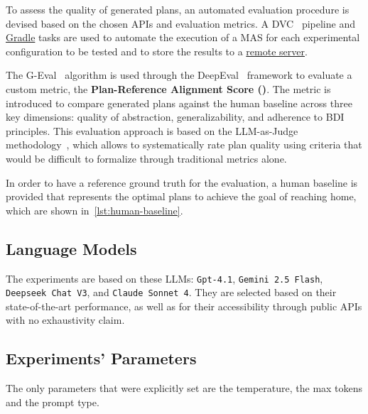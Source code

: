 \documentclass[12pt,a4paper,openright,twoside]{book}
\begin{document}
To assess the quality of generated plans, an automated evaluation procedure is devised based on the chosen APIs and evaluation metrics.
%
A DVC~\cite{ruslan_kuprieiev_2025_15646974} pipeline and \href{https://gradle.org/}{Gradle} tasks are used to automate the execution of a MAS for each experimental configuration to be tested and to store the results to a \href{https://dagshub.com/rbattistini/plan-generation-experiments}{remote server}.

The G-Eval~\cite{liuGEvalNLGEvaluation2023} algorithm is used through the DeepEval~\cite{Ip_deepeval_2025} framework to evaluate a custom metric, the \textbf{Plan-Reference Alignment Score (\PRAS{})}.
%
The metric is introduced to compare generated plans against the human baseline across three key dimensions: quality of abstraction, generalizability, and adherence to BDI principles.
%
This evaluation approach is based on the LLM-as-Judge methodology~\cite{DBLP:journals/corr/abs-2412-05579}, which allows to systematically rate plan quality using criteria that would be difficult to formalize through traditional metrics alone.

In order to have a reference ground truth for the evaluation, a human baseline is provided that represents the optimal plans to achieve the goal of reaching home, which are shown in~\cref{lst:human-baseline}.



\subsection{Language Models}\label{sec:chosen-llms}

The experiments are based on these \ac{LLM}s: \texttt{Gpt-4.1}, \texttt{Gemini 2.5 Flash}, \texttt{Deepseek Chat V3}, and \texttt{Claude Sonnet 4}.
%
They are selected based on their state-of-the-art performance, as well as for their accessibility through public APIs with no exhaustivity claim.

\subsection{Experiments' Parameters}\label{sec:generation-parameters}

The only parameters that were explicitly set are the temperature, the max tokens and the prompt type.
\end{document}
